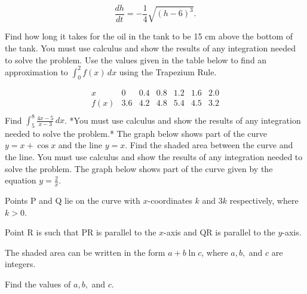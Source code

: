 \documentclass[12pt,addpoints]{exam}
\begin{document}
\begin{questions}
\[ 
\frac{dh}{dt} = -\frac{1}{4} \sqrt{(h-6)^3}. 
\]

Find how long it takes for the oil in the tank to be 15 cm above the bottom of the tank. You must use calculus and show the results of any integration needed to solve the problem.
\fillwithlines{3cm}
\question[5] Use the values given in the table below to find an approximation to \(\int_0^2 f(x) \, dx\) using the Trapezium Rule.

\[
\begin{array}{c|cccccc}
x & 0 & 0.4 & 0.8 & 1.2 & 1.6 & 2.0 \\
\hline
f(x) & 3.6 & 4.2 & 4.8 & 5.4 & 4.5 & 3.2 \\
\end{array}
\]
\fillwithlines{3cm}
\question[5] Find \(\int_5^8 \frac{4x-5}{x-3} \, dx\). *You must use calculus and show the results of any integration needed to solve the problem.*
\fillwithlines{3cm}
\question[5] The graph below shows part of the curve \( y = x + \cos x \) and the line \( y = x \). Find the shaded area between the curve and the line. You must use calculus and show the results of any integration needed to solve the problem.
\fillwithlines{3cm}
\question[5] The graph below shows part of the curve given by the equation \( y = \frac{2}{x} \).

Points P and Q lie on the curve with \( x \)-coordinates \( k \) and \( 3k \) respectively, where \( k > 0 \).

Point R is such that PR is parallel to the \( x \)-axis and QR is parallel to the \( y \)-axis.

The shaded area can be written in the form \( a + b \ln c \), where \( a, b, \) and \( c \) are integers.

Find the values of \( a, b, \) and \( c \).


\end{questions}
\end{document}
